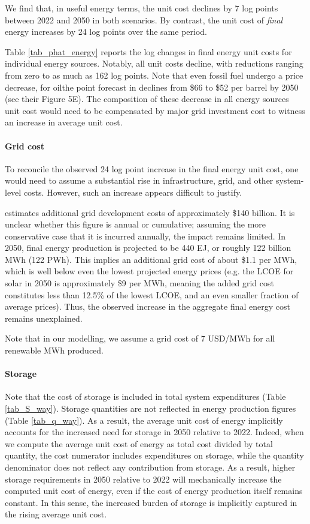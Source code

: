 \documentclass[11pt]{article}
\begin{document}
We find that, in useful energy terms, the unit cost declines by 7 log points between 2022 and 2050 in both scenarios. By contrast, the unit cost of \textit{final} energy increases by 24 log points over the same period. 

Table \ref{tab_phat_energy} reports the log changes in final energy unit costs for individual energy sources. Notably, all unit costs decline, with reductions ranging from  zero to as much as 162 log points. Note that even fossil fuel undergo a price decrease, for oilthe point forecast in \cite{wayEmpiricallyGroundedTechnology2022} declines from \$66 to \$52 per barrel by 2050 (see their Figure 5E). The composition of these decrease in all energy sources unit cost would need to be compensated by major grid investment cost to witness an increase in average unit cost.

\paragraph{Grid cost} To reconcile the observed 24 log point increase in the final energy unit cost, one would need to assume a substantial rise in infrastructure, grid, and other system-level costs. However, such an increase appears difficult to justify.

\cite{wayEmpiricallyGroundedTechnology2022} estimates additional grid development costs of approximately \$140 billion. It is unclear whether this figure is annual or cumulative; assuming the more conservative case that it is incurred annually, the impact remains limited. In 2050, final energy production is projected to be 440 EJ, or roughly 122 billion MWh (122 PWh). This implies an additional grid cost of about \$1.1 per MWh, which is well below even the lowest projected energy prices (e.g. the LCOE for solar in 2050 is approximately \$9 per MWh, meaning the added grid cost constitutes less than 12.5\% of the lowest LCOE, and an even smaller fraction of average prices). Thus, the observed increase in the aggregate final energy cost remains unexplained.

Note that in our modelling, we assume a grid cost of 7 USD/MWh for all renewable MWh produced.

\paragraph{Storage} Note that the cost of storage is included in total system expenditures (Table \ref{tab_S_way}). Storage quantities are not reflected in energy production figures (Table \ref{tab_q_way}). As a result, the average unit cost of energy implicitly accounts for the increased need for storage in 2050 relative to 2022. Indeed, when we compute the average unit cost of energy as total cost divided by total quantity, the cost numerator includes expenditures on storage, while the quantity denominator does not reflect any contribution from storage. As a result, higher storage requirements in 2050 relative to 2022 will mechanically increase the computed unit cost of energy, even if the cost of energy production itself remains constant. In this sense, the increased burden of storage is implicitly captured in the rising average unit cost.
\end{document}
